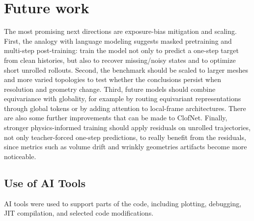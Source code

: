 \documentclass[11pt,a4paper,reqno]{amsart}
\theoremstyle{definition}
\theoremstyle{remark}
\numberwithin{equation}{section}
\begin{document}
\section{Future work}\label{sec:futurework}
The most promising next directions are exposure-bias mitigation and scaling. First, the analogy with language modeling suggests masked pretraining and multi-step post-training: train the model not only to predict a one-step target from clean histories, but also to recover missing/noisy states and to optimize short unrolled rollouts. Second, the benchmark should be scaled to larger meshes and more varied topologies to test whether the conclusions persist when resolution and geometry change. Third, future models should combine equivariance with globality, for example by routing equivariant representations through global tokens or by adding attention to local-frame architectures. There are also some further improvements that can be made to ClofNet. Finally, stronger physics-informed training should apply residuals on unrolled trajectories, not only teacher-forced one-step predictions, to really benefit from the residuals, since metrics such as volume drift and wrinkly geometries artifacts become more noticeable.

\subsection*{Use of AI Tools}

AI tools were used to support parts of the code, including plotting, debugging, JIT compilation, and selected code modifications. 
\end{document}
